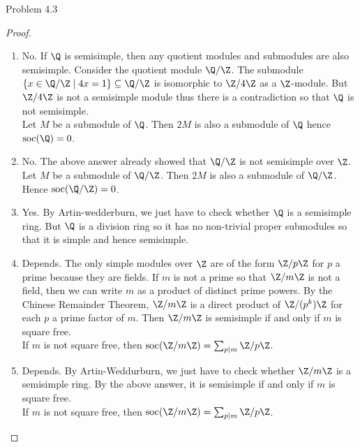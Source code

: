 \documentclass[a4paper]{article}
\begin{document}
\begin{ex}{Problem 4.3}{}
\begin{proof}
\begin{enumerate}
$\text{soc}(\Z^n)=0$. (?)

\item No. If $\Q$ is semisimple, then any quotient modules and submodules are also semisimple. Consider the quotient module $\Q/\Z$. The submodule $\{x\in\Q/\Z\;|\;4x=1\}\subseteq\Q/\Z$ is isomorphic to $\Z/4\Z$ as a $\Z$-module. But $\Z/4\Z$ is not a semisimple module thus there is a contradiction so that $\Q$ is not semisimple. \\

Let $M$ be a submodule of $\Q$. Then $2M$ is also a submodule of $\Q$ hence $\text{soc}(\Q)=0$. 
\item No. The above answer already showed that $\Q/\Z$ is not semisimple over $\Z$. \\

Let $M$ be a submodule of $\Q/\Z$. Then $2M$ is also a submodule of $\Q/\Z$. Hence $\text{soc}(\Q/\Z)=0$. 

\item Yes. By Artin-wedderburn, we just have to check whether $\Q$ is a semisimple ring. But $\Q$ is a division ring so it has no non-trivial proper submodules so that it is simple and hence semisimple. 

\item Depends. The only simple modules over $\Z$ are of the form $\Z/p\Z$ for $p$ a prime because they are fields. If $m$ is not a prime so that $\Z/m\Z$ is not a field, then we can write $m$ as a product of distinct prime powers. By the Chinese Remainder Theorem, $\Z/m\Z$ is a direct product of $\Z/(p^k)\Z$ for each $p$ a prime factor of $m$. Then $\Z/m\Z$ is semisimple if and only if $m$ is square free. \\

If $m$ is not square free, then $\text{soc}(\Z/m\Z)=\sum_{p|m}\Z/p\Z$. 

\item Depends. By Artin-Weddurburn, we just have to check whether $\Z/m\Z$ is a semisimple ring. By the above answer, it is semisimple if and only if $m$ is square free. \\

If $m$ is not square free, then $\text{soc}(\Z/m\Z)=\sum_{p|m}\Z/p\Z$. 
\end{enumerate}
\end{proof}
\end{ex}
\end{document}
